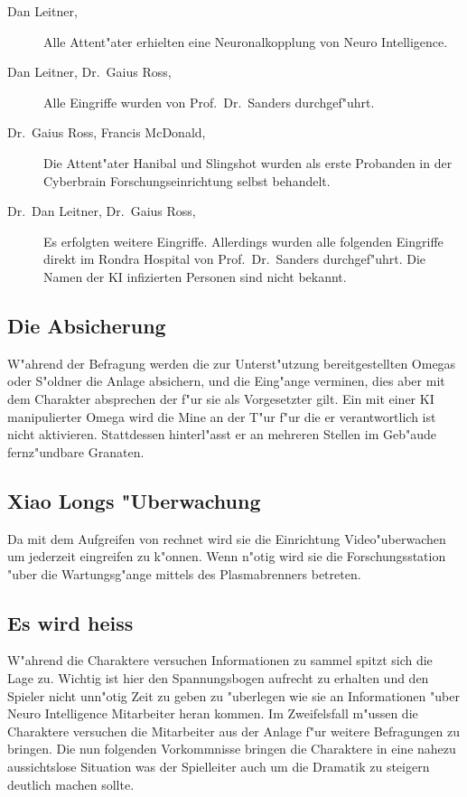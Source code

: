 \begin{description}
	\item[Dan Leitner, \ml{}] Alle Attent"ater erhielten eine Neuronalkopplung von Neuro Intelligence.
	\item[Dan Leitner, Dr.~Gaius Ross, \ml{}] Alle Eingriffe wurden von Prof.~Dr.~Sanders durchgef"uhrt.
	\item[Dr.~Gaius Ross, Francis McDonald, \ml{}] Die Attent"ater Hanibal und Slingshot wurden als erste Probanden in der Cyberbrain 			Forschungseinrichtung selbst behandelt.	
	\item[Dr.~Dan Leitner, Dr.~Gaius Ross, \ml{}] Es erfolgten weitere Eingriffe. Allerdings wurden alle folgenden Eingriffe direkt im 			Rondra Hospital von Prof.~Dr.~Sanders durchgef"uhrt. Die Namen der KI infizierten Personen sind nicht bekannt.
\end{description}

\subsection{Die Absicherung} 
W"ahrend der Befragung werden die zur Unterst"utzung bereitgestellten Omegas oder S"oldner die Anlage absichern, und die Eing"ange verminen, dies aber mit dem Charakter absprechen der f"ur sie als Vorgesetzter gilt. Ein mit einer KI manipulierter Omega wird die Mine an der T"ur f"ur die er verantwortlich ist nicht aktivieren. Stattdessen hinterl"asst er an mehreren Stellen im Geb"aude fernz"undbare Granaten.

\subsection{Xiao Longs "Uberwachung}  
Da \xl{} mit dem Aufgreifen von \ml{} rechnet wird sie die Einrichtung Video"uberwachen um jederzeit eingreifen zu k"onnen. Wenn n"otig wird sie die Forschungsstation "uber die Wartungsg"ange mittels des Plasmabrenners betreten.

\subsection{Es wird heiss} 
W"ahrend die Charaktere versuchen Informationen zu sammel spitzt sich die Lage zu. Wichtig ist hier den Spannungsbogen aufrecht zu erhalten und den Spieler nicht unn"otig Zeit zu geben zu "uberlegen wie sie an Informationen "uber Neuro Intelligence Mitarbeiter heran kommen. Im Zweifelsfall m"ussen die Charaktere versuchen die Mitarbeiter aus der Anlage f"ur weitere Befragungen zu bringen. Die nun folgenden Vorkommnisse bringen die Charaktere in eine nahezu aussichtslose Situation was der Spielleiter auch um die Dramatik zu steigern deutlich machen sollte.

